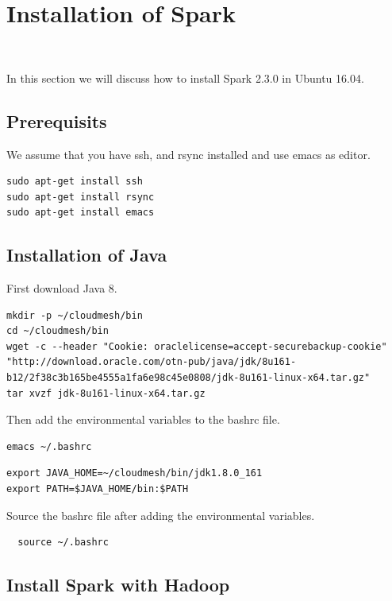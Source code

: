 \section{Installation of Spark}
\label{c:spark-local-installation}
\FILENAME\

In this section we will discuss how to install Spark 2.3.0 in Ubuntu 16.04.

\subsection{Prerequisits}

We assume that you have ssh, and rsync installed and
use emacs as editor. 

\begin{lstlisting}
sudo apt-get install ssh
sudo apt-get install rsync
sudo apt-get install emacs
\end{lstlisting}

\subsection{Installation of Java}

First download Java 8.

\begin{lstlisting}
mkdir -p ~/cloudmesh/bin
cd ~/cloudmesh/bin
wget -c --header "Cookie: oraclelicense=accept-securebackup-cookie" "http://download.oracle.com/otn-pub/java/jdk/8u161-b12/2f38c3b165be4555a1fa6e98c45e0808/jdk-8u161-linux-x64.tar.gz"
tar xvzf jdk-8u161-linux-x64.tar.gz
\end{lstlisting}

Then add the environmental variables to the bashrc file. 

\begin{lstlisting}
emacs ~/.bashrc
\end{lstlisting}

\begin{lstlisting}
export JAVA_HOME=~/cloudmesh/bin/jdk1.8.0_161
export PATH=$JAVA_HOME/bin:$PATH
\end{lstlisting}

Source the bashrc file after adding the environmental variables.

\begin{lstlisting}
  source ~/.bashrc
\end{lstlisting}

\subsection{Install Spark with Hadoop}\label{s:s:install-spark-with-hadoop}

